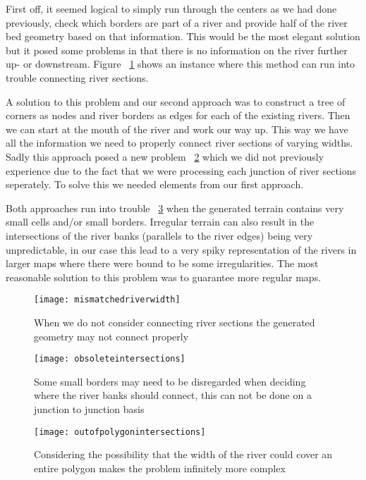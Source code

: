 First off, it seemed logical to simply run through the centers as we had done previously, check which borders are part of a river and provide half of the river bed geometry based on that information. This would be the most elegant solution but it posed some problems in that there is no information on the river further up- or downstream. Figure ~\ref{riverproblem1} shows an instance where this method can run into trouble connecting river sections.

A solution to this problem and our second approach was to construct a tree of corners as nodes and river borders as edges for each of the existing rivers. Then we can start at the mouth of the river and work our way up. This way we have all the information we need to properly connect river sections of varying widths. Sadly this approach posed a new problem ~\ref{riverproblem2} which we did not previously experience due to the fact that we were processing each junction of river sections seperately. To solve this we needed elements from our first approach. 

Both approaches run into trouble ~\ref{riverproblem3} when the generated terrain contains very small cells and/or small borders. Irregular terrain can also result in the intersections of the river banks (parallels to the river edges) being very unpredictable, in our case this lead to a very spiky representation of the rivers in larger maps where there were bound to be some irregularities. The most reasonable solution to this problem was to guarantee more regular maps.

\begin{figure}
	\centering
	\texttt{[image: mismatchedriverwidth]}
	\caption{When we do not consider connecting river sections the generated geometry may not connect properly}
	\label{riverproblem1}
\end{figure}

\begin{figure}
	\centering
	\texttt{[image: obsoleteintersections]}
	\caption{Some small borders may need to be disregarded when deciding where the river banks should connect, this can not be done on a junction to junction basis}
	\label{riverproblem2}
\end{figure}

\begin{figure}
	\centering
	\texttt{[image: outofpolygonintersections]}
	\caption{Considering the possibility that the width of the river could cover an entire polygon makes the problem infinitely more complex}
	\label{riverproblem3}
\end{figure}

